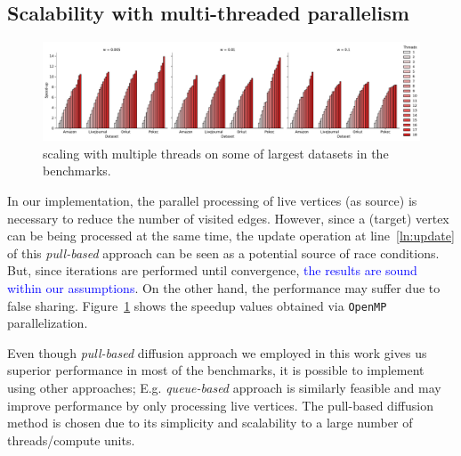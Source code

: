 \documentclass[10pt,journal,compsoc]{IEEEtran}
\newcommand\myeq{\mkern1.5mu{=}\mkern1.5mu}
\newcommand\ggx[1]{\textcolor{blue}{#1}}
\newcommand\acro{{\sc{HyperFuseR\xspace}\xspace}\xspace}
\begin{document}



\subsection{Scalability with multi-threaded parallelism}

\begin{figure}[!ht] 
    \centering
    \includegraphics[width=\linewidth]{images/threads.pdf}
   \centering \caption{\acro scaling with multiple threads on some of largest datasets in the benchmarks.
     \label{fig:scaling}} 
\end{figure}


In our implementation, the parallel processing of live vertices  (as source) is necessary to reduce the number of visited edges. However, since a (target) vertex can be being processed at the same time, the update operation at line~\ref {ln:update} of this {\em pull-based} approach can be seen as a potential source of race conditions. But, since iterations are performed until convergence, \ggx{the results are sound within our assumptions}. On the other hand, the performance may suffer due to false sharing.
Figure~\ref{fig:scaling} shows the speedup values obtained via {\tt OpenMP} parallelization.

Even though {\em pull-based} diffusion approach we employed in this work gives us superior performance in most of the benchmarks, it is possible to implement \acro using other approaches; E.g. {\em queue-based} approach is similarly feasible and may improve performance by only processing live vertices. The pull-based diffusion method is chosen due to its simplicity and scalability to a large number of threads/compute units. 
\end{document}

